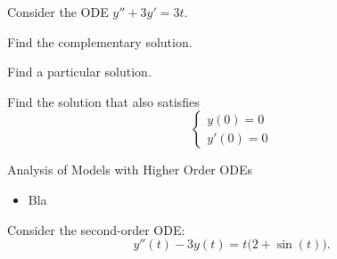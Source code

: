 \bookonlynewpage


\question
	Consider the ODE \quad $y'' + 3y' = 3t$.
\begin{parts}
	\item Find the complementary solution.
	\item Find a particular solution.
	\item Find the solution that also satisfies
	$$ \begin{cases}
		y(0)=0 \\
		y'(0)=0
	\end{cases}$$
\end{parts}





\standardonlynewpage

%
%



\begin{module}{Analysis of Models with Higher Order ODEs}
	\label{2nd:analysis}

	
	
\end{module}



\begin{lesson}

	\begin{itemize}
		\item Bla
	\end{itemize}
	

\end{lesson}





\question
	Consider the second-order ODE:
	$$
	y''(t) - 3y(t) = t \big( 2 + \sin(t) \big).
	$$
	
